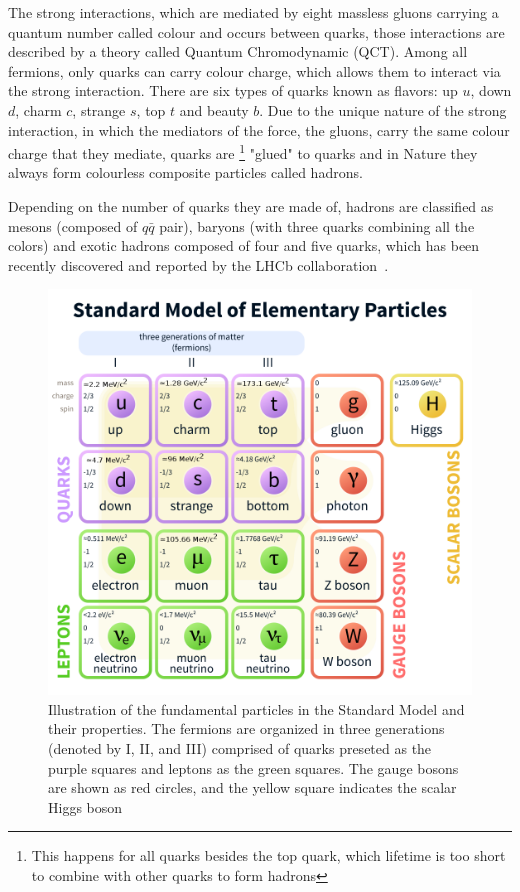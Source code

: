 The strong interactions, which are mediated by eight massless gluons carrying a quantum number called colour and occurs between quarks, those interactions are described by a theory called Quantum Chromodynamic (QCT). Among all fermions, only quarks can carry colour charge, which allows them to interact via the strong interaction. There are six types of quarks known as flavors: up $u$,  down $d$, charm $c$, strange $s$, top $t$ and beauty $b$.  Due to the unique nature of the strong interaction, in which the mediators of the force, the gluons, carry the same colour charge that they mediate, quarks are \footnote{This happens for all quarks besides the top quark, which lifetime is too short to combine with other quarks to form hadrons} "glued" to quarks and in Nature they always form colourless composite particles called hadrons. 

Depending on the number of quarks they are made of, hadrons are classified as mesons (composed of $q\bar{q}$ pair), baryons (with three quarks combining all the colors) and exotic hadrons composed of four and five quarks, which has been recently discovered and reported by the LHCb collaboration~\cite{pentaquarks}.  

\begin{figure}
\centering
\includegraphics[scale=1.0]{figures/SM.png}
\caption{Illustration of the fundamental particles in the Standard Model and their properties. The fermions are organized in three generations (denoted by I, II, and III) comprised of quarks preseted as the purple squares and leptons as the green squares. The  gauge bosons are shown as red circles, and the yellow square indicates the scalar Higgs boson 
\label{fig:SM}}
\end{figure}

